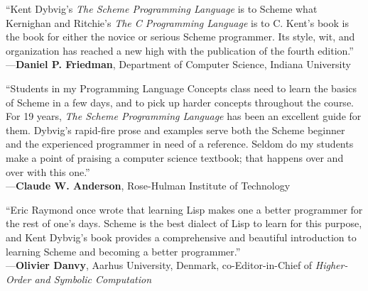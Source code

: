 ``Kent Dybvig's \textit{The Scheme Programming Language} is to Scheme what Kernighan and Ritchie's \textit{The C Programming Language} is to C. Kent's book is the book for either the novice or serious Scheme programmer. Its style, wit, and organization has reached a new high with the publication of the fourth edition.'' \\
---\textbf{Daniel P. Friedman}, Department of Computer Science, Indiana University

``Students in my Programming Language Concepts class need to learn the basics of Scheme in a few days, and to pick up harder concepts throughout the course. For 19 years, \textit{The Scheme Programming Language} has been an excellent guide for them. Dybvig's rapid-fire prose and examples serve both the Scheme beginner and the experienced programmer in need of a reference. Seldom do my students make a point of praising a computer science textbook; that happens over and over with this one.'' \\
---\textbf{Claude W. Anderson}, Rose-Hulman Institute of Technology

``Eric Raymond once wrote that learning Lisp makes one a better programmer for the rest of one's days. Scheme is the best dialect of Lisp to learn for this purpose, and Kent Dybvig's book provides a comprehensive and beautiful introduction to learning Scheme and becoming a better programmer.'' \\
---\textbf{Olivier Danvy}, Aarhus University, Denmark, co-Editor-in-Chief of \textit{Higher-Order and Symbolic Computation}